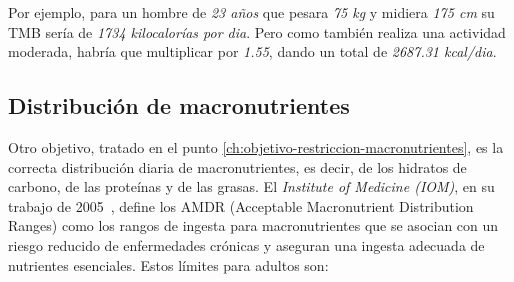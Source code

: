 Por ejemplo, para un hombre de \textit{23 años} que pesara \textit{75 kg} y midiera \textit{175 cm} su TMB sería de \textit{1734 kilocalorías por dia}. Pero como también realiza una actividad moderada, habría que multiplicar por \textit{1.55}, dando un total de \textit{2687.31 kcal/dia}.

\subsection{Distribución de macronutrientes}
\label{ch:distribucion-macronutrientes}

Otro objetivo, tratado en el punto \ref{ch:objetivo-restriccion-macronutrientes}, es la correcta distribución diaria de macronutrientes, es decir, de los hidratos de carbono, de las proteínas y de las grasas. El \textit{Institute of Medicine (IOM)}, en su trabajo de 2005~\cite{IOM2005}, define los AMDR (Acceptable Macronutrient Distribution Ranges) como los rangos de ingesta para macronutrientes que se asocian con un riesgo reducido de enfermedades crónicas y aseguran una ingesta adecuada de nutrientes esenciales. Estos límites para adultos son:

